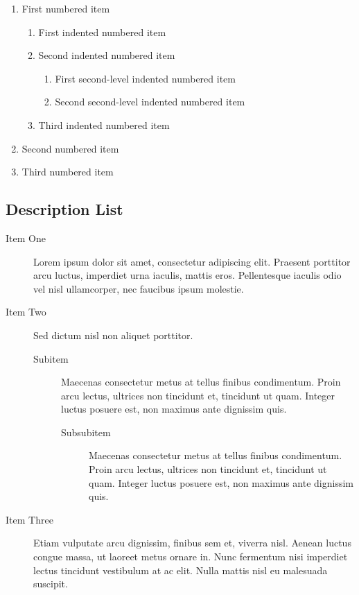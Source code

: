 \documentclass[a4paper]{CSMakotoTechnicalReport}
\begin{document}
\begin{multicols}{2}
    \begin{enumerate}
        \item First numbered item
            \begin{enumerate}
                \item First indented numbered item
                \item Second indented numbered item
                    \begin{enumerate}
                        \item First second-level indented numbered item
                        \item Second second-level indented numbered item
                    \end{enumerate}
                \item Third indented numbered item
            \end{enumerate}
        \item Second numbered item
        \item Third numbered item
    \end{enumerate}


    \subsection{Description List}

    \begin{description}
        \item[Item One] Lorem ipsum dolor sit amet, consectetur adipiscing elit. Praesent porttitor arcu luctus, imperdiet urna iaculis, mattis eros. Pellentesque iaculis odio vel nisl ullamcorper, nec faucibus ipsum molestie. 
        \item[Item Two] Sed dictum nisl non aliquet porttitor.
            \begin{description}
                \item[Subitem] Maecenas consectetur metus at tellus finibus condimentum. Proin arcu lectus, ultrices non tincidunt et, tincidunt ut quam. Integer luctus posuere est, non maximus ante dignissim quis.
                    \begin{description}
                        \item[Subsubitem] Maecenas consectetur metus at tellus finibus condimentum. Proin arcu lectus, ultrices non tincidunt et, tincidunt ut quam. Integer luctus posuere est, non maximus ante dignissim quis.
                    \end{description}
            \end{description}
        \item[Item Three] Etiam vulputate arcu dignissim, finibus sem et, viverra nisl. Aenean luctus congue massa, ut laoreet metus ornare in. Nunc fermentum nisi imperdiet lectus tincidunt vestibulum at ac elit. Nulla mattis nisl eu malesuada suscipit.
    \end{description}


\end{multicols}
\end{document}
